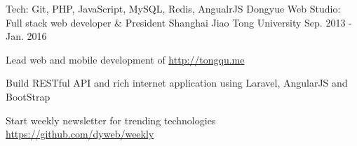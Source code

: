 \begin{cventries}
  \cventry
  {Tech: Git, PHP, JavaScript, MySQL, Redis, AngualrJS} %
  {Dongyue Web Studio: Full stack web developer \& President} %
  {Shanghai Jiao Tong University} %
  {Sep. 2013 - Jan. 2016} %
  {
    \begin{cvitems} %
      \item {Lead web and mobile development of \url{http://tongqu.me}}
      \item {Build RESTful API and rich internet application using Laravel, AngularJS and BootStrap}
      \item {Start weekly newsletter for trending technologies \url{https://github.com/dyweb/weekly}}
    \end{cvitems}
  }

\end{cventries}
